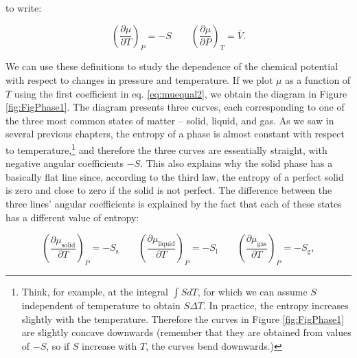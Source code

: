 \documentclass[
  9pt,
]{extbook}
\theoremstyle{definition}
\theoremstyle{definition}
\theoremstyle{definition}
\theoremstyle{remark}
\begin{document}
to write:

\begin{equation}
\left( \frac{\partial \mu}{\partial T} \right)_P=-S \qquad \left( \frac{\partial \mu}{\partial P} \right)_T =\overline{V}.
\label{eq:muequal2}
\end{equation}

We can use these definitions to study the dependence of the chemical potential with respect to changes in pressure and temperature. If we plot \(\mu\) as a function of \(T\) using the first coefficient in eq. \eqref{eq:muequal2}, we obtain the diagram in Figure \ref{fig:FigPhase1}. The diagram presents three curves, each corresponding to one of the three most common states of matter -- solid, liquid, and gas. As we saw in several previous chapters, the entropy of a phase is almost constant with respect to temperature,\footnote{Think, for example, at the integral \(\int SdT\), for which we can assume \(S\) independent of temperature to obtain \(S\Delta T\). In practice, the entropy increases slightly with the temperature. Therefore the curves in Figure \ref{fig:FigPhase1} are slightly concave downwards (remember that they are obtained from values of \(-S\), so if \(S\) increase with \(T\), the curves bend downwards.)} and therefore the three curves are essentially straight, with negative angular coefficients \(-S\). This also explains why the solid phase has a basically flat line since, according to the third law, the entropy of a perfect solid is zero and close to zero if the solid is not perfect. The difference between the three lines' angular coefficients is explained by the fact that each of these states has a different value of entropy:

\begin{equation}
\left( \frac{\partial \mu_{\text{solid}}}{\partial T} \right)_P =-S_{\text{s}} \qquad \left( \frac{\partial \mu_{\text{liquid}}}{\partial T} \right)_P =-S_{\text{l}} \qquad \left( \frac{\partial \mu_{\text{gas}}}{\partial T} \right)_P =-S_{\text{g}},
\label{eq:muequal3}
\end{equation}
\end{document}
